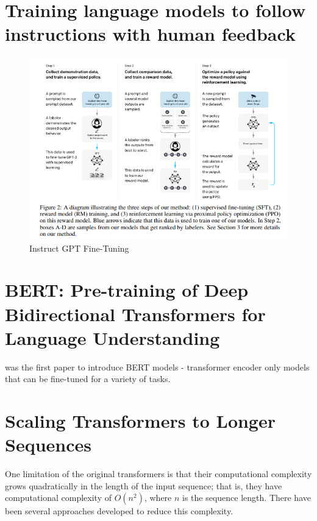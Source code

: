 \documentclass[11pt]{article}
\theoremstyle{definition}
\begin{document}
\section{Training language models to follow instructions with human feedback \cite{ouyang2022training}}

\begin{figure}
\centering
  \includegraphics[width=\textwidth,height=\textheight,keepaspectratio]{transformers/instructgpt.png}
  \caption{Instruct GPT Fine-Tuning \cite{ouyang2022training}}
  \label{fig:instructgpt}
\end{figure}

\section{BERT: Pre-training of Deep Bidirectional Transformers for Language Understanding}

\cite{devlin2019bert} was the first paper to introduce BERT models - transformer encoder only models that can be fine-tuned for a variety of tasks.

\section{Scaling Transformers to Longer Sequences}

One limitation of the original transformers is that their computational complexity grows quadratically in the length of the input sequence; that is, they have computational complexity of $O(n^2)$, where $n$ is the sequence length. There have been several approaches developed to reduce this complexity.
\end{document}
